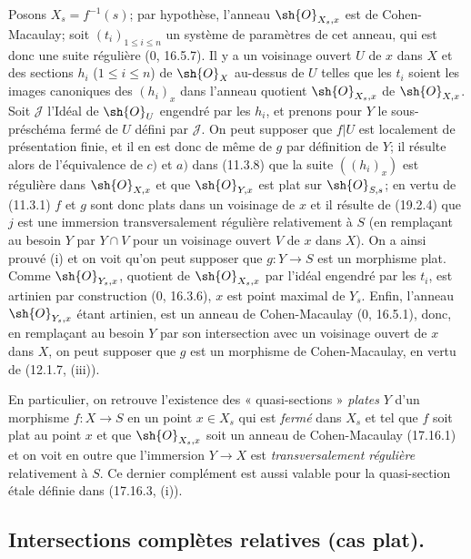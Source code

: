 Posons $X_s=f^{-1}(s)$; par hypothèse, l'anneau $\sh{O}_{X_s,x}$ est de Cohen-Macaulay; soit $(t_i)_{1\leq i\leq n}$ un système de paramètres de cet anneau, qui est donc une suite régulière ($0$, 16.5.7). Il y a un voisinage ouvert $U$ de $x$ dans $X$ et des sections $h_i$ ($1\leq i\leq n$) de $\sh{O}_X$ au-dessus de $U$ telles que les $t_i$ soient les images canoniques des $(h_i)_x$ dans l'anneau quotient $\sh{O}_{X_s,x}$ de $\sh{O}_{X,x}$. Soit $\mathscr J$ l'Idéal de $\sh{O}_U$ engendré par les $h_i$, et prenons pour $Y$ le sous-préschéma fermé de $U$ défini par $\mathscr J$. On peut supposer que $f|U$ est localement de présentation finie, et il en est donc de même de $g$ par définition de $Y$; il résulte alors de l'équivalence de $c)$ et $a)$ dans (11.3.8) que la suite $((h_i)_x)$ est régulière dans $\sh{O}_{X,x}$ et que $\sh{O}_{Y,x}$ est plat sur $\sh{O}_{S,s}$; en vertu de (11.3.1) $f$ et $g$ sont donc plats dans un voisinage de $x$ et il résulte de (19.2.4) que $j$ est une immersion transversalement régulière relativement à $S$ (en remplaçant au besoin $Y$ par $Y\cap V$ pour un voisinage ouvert $V$ de $x$ dans $X$). On a ainsi prouvé (i) et on voit qu'on peut supposer que $g:Y\to S$ est un morphisme plat. Comme $\sh{O}_{Y_s,x}$, quotient de $\sh{O}_{X_s,x}$ par l'idéal engendré par les $t_i$, est artinien par construction ($0$, 16.3.6), $x$ est point maximal de $Y_s$. Enfin, l'anneau $\sh{O}_{Y_s,x}$ étant artinien, est un anneau de Cohen-Macaulay ($0$, 16.5.1), donc, en remplaçant au besoin $Y$ par son intersection avec un voisinage ouvert de $x$ dans $X$, on peut supposer que $g$ est un morphisme de Cohen-Macaulay, en vertu de (12.1.7, (iii)).

En particulier, on retrouve l'existence des « quasi-sections » \emph{plates} $Y$ d'un morphisme $f:X\to S$ en un point $x\in X_s$ qui est \emph{fermé} dans $X_s$ et tel que $f$ soit plat au point $x$ et que $\sh{O}_{X_s,x}$ soit un anneau de Cohen-Macaulay (17.16.1) et on voit en outre que l'immersion $Y\to X$ est \emph{transversalement régulière} relativement à $S$. Ce dernier complément est aussi valable pour la quasi-section étale définie dans (17.16.3, (i)).

\subsection{Intersections complètes relatives (cas plat).}

